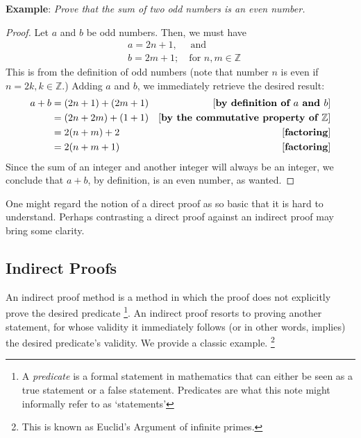 \documentclass[10pt,a4paper,fleqn]{book}
\newcommand{\example}[1]{\textbf{Example}: \emph{#1}}
\newcommand{\justification}[1]{\text{[\textbf{#1}]}}
\begin{document}
	\noindent \example{Prove that the sum of two odd numbers is an even number.}
	\begin{proof}
		Let $a$ and $b$ be odd numbers. Then, we must have
		\begin{align*}
			&a = 2n + 1, \quad \text{ and}   \\
			&b = 2m + 1; \quad \text{for } n,m \in \mathbb{Z}
		\end{align*}
		This is from the definition of odd numbers (note that number $n$ is even if $n = 2k, k \in \mathbb{Z}$.) Adding $a$ and $b$, we immediately retrieve the desired result:
		\begin{align*}
			a + b &= (2n + 1) + (2m + 1) 	& \justification{by definition of $a$ and $b$} \\
					 &= (2n + 2m) + (1 + 1) 	& \justification{by the commutative property of $\mathbb{Z}$} \\
					 &= 2(n+m) + 2			& \justification{factoring} \\
					 &= 2(n+m+1)				& \justification{factoring}
		\end{align*}
		Since the sum of an integer and another integer will always be an integer, we conclude that $a+b$, by definition, is an even number, as wanted.
	\end{proof}
	One might regard the notion of a direct proof as so basic that it is hard to understand. Perhaps contrasting a direct proof against an indirect proof may bring some clarity.

	\subsection{Indirect Proofs}
	An indirect proof method is a method in which the proof does not explicitly prove the desired predicate \footnote{A \emph{predicate} is a formal statement in mathematics that can either be seen as a true statement or a false statement. Predicates are what this note might informally refer to as `statements'}. An indirect proof resorts to proving another statement, for whose validity it immediately follows (or in other words, implies) the desired predicate's validity. We provide a classic example. \footnote{This is known as Euclid's Argument of infinite primes.} \\
\end{document}
